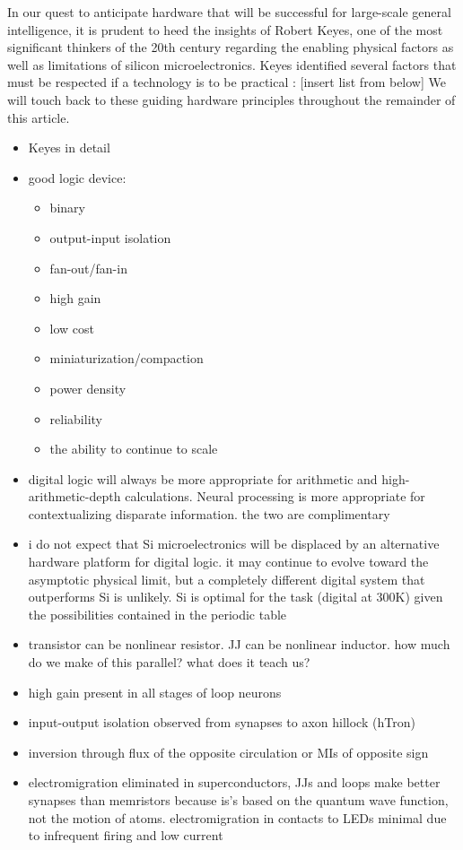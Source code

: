 In our quest to anticipate hardware that will be successful for large-scale general intelligence, it is prudent to heed the insights of Robert Keyes, one of the most significant thinkers of the 20th century regarding the enabling physical factors as well as limitations of silicon microelectronics. Keyes identified several factors that must be respected if a technology is to be practical \cite{ke1985a,ke1985b}: [insert list from below] We will touch back to these guiding hardware principles throughout the remainder of this article.


\begin{itemize}
\item Keyes in detail
\item good logic device:
\begin{itemize}
\item binary
\item output-input isolation
\item fan-out/fan-in
\item high gain
\item low cost
\item miniaturization/compaction
\item power density
\item reliability
\item the ability to continue to scale
\end{itemize}
\item digital logic will always be more appropriate for arithmetic and high-arithmetic-depth calculations. Neural processing is more appropriate for contextualizing disparate information. the two are complimentary
\item i do not expect that Si microelectronics will be displaced by an alternative hardware platform for digital logic. it may continue to evolve toward the asymptotic physical limit, but a completely different digital system that outperforms Si is unlikely. Si is optimal for the task (digital at 300K) given the possibilities contained in the periodic table
\item transistor can be nonlinear resistor. JJ can be nonlinear inductor. how much do we make of this parallel? what does it teach us?
\item high gain present in all stages of loop neurons
\item input-output isolation observed from synapses to axon hillock (hTron)
\item inversion through flux of the opposite circulation or MIs of opposite sign
\item electromigration eliminated in superconductors, JJs and loops make better synapses than memristors because is's based on the quantum wave function, not the motion of atoms. electromigration in contacts to LEDs minimal due to infrequent firing and low current

\end{itemize}
